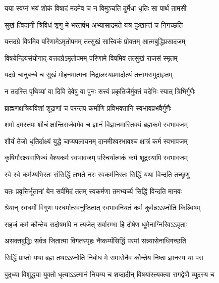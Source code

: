 \twolineshloka
{यया स्वप्नं भयं शोकं विषादं मदमेव च}
{न विमुञ्चति दुर्मेधा धृतिः सा पार्थ तामसी}%

\twolineshloka
{सुखं त्विदानीं त्रिविधं शृणु मे भरतर्षभ}
{अभ्यासाद्रमते यत्र दुःखान्तं च निगच्छति}%

\twolineshloka
{यत्तदग्रे विषमिव परिणामेऽमृतोपमम्}
{तत्सुखं सात्त्विकं प्रोक्तम् आत्मबुद्धिप्रसादजम्}%

\twolineshloka
{विषयेन्द्रियसंयोगाद्-यत्तदग्रेऽमृतोपमम्}
{परिणामे विषमिव तत्सुखं राजसं स्मृतम्}%

\twolineshloka
{यदग्रे चानुबन्धे च सुखं मोहनमात्मनः}
{निद्रालस्यप्रमादोत्थं तत्तामसमुदाहृतम्}%

\twolineshloka
{न तदस्ति पृथिव्यां वा दिवि देवेषु वा पुनः}
{सत्त्वं प्रकृतिजैर्मुक्तं यदेभिः स्यात् त्रिभिर्गुणैः}%

\twolineshloka
{ब्राह्मणक्षत्रियविशां शूद्राणां च परन्तप}
{कर्माणि प्रविभक्तानि स्वभावप्रभवैर्गुणैः}%

\twolineshloka
{शमो दमस्तपः शौचं क्षान्तिरार्जवमेव च}
{ज्ञानं विज्ञानमास्तिक्यं ब्रह्मकर्म स्वभावजम्}%

\twolineshloka
{शौर्यं तेजो धृतिर्दाक्ष्यं युद्धे चाप्यपलायनम्}
{दानमीश्वरभावश्च क्षात्रं कर्म स्वभावजम्}%

\twolineshloka
{कृषिगौरक्ष्यवाणिज्यं वैश्यकर्म स्वभावजम्}
{परिचर्यात्मकं कर्म शूद्रस्यापि स्वभावजम्}%

\twolineshloka
{स्वे स्वे कर्मण्यभिरतः संसिद्धिं लभते नरः}
{स्वकर्मनिरतः सिद्धिं यथा विन्दति तच्छृणु}%

\twolineshloka
{यतः प्रवृत्तिर्भूतानां येन सर्वमिदं ततम्}
{स्वकर्मणा तमभ्यर्च्य सिद्धिं विन्दति मानवः}%

\twolineshloka
{श्रेयान् स्वधर्मो विगुणः परधर्मात्स्वनुष्ठितात्}
{स्वभावनियतं कर्म कुर्वन्नऽऽप्नोति किल्बिषम्}%

\twolineshloka
{सहजं कर्म कौन्तेय सदोषमपि न त्यजेत्}
{सर्वारम्भा हि दोषेण धूमेनाग्निरिवऽऽवृताः}%

\twolineshloka
{असक्तबुद्धिः सर्वत्र जितात्मा विगतस्पृहः}
{नैष्कर्म्यसिद्धिं परमां सन्न्यासेनाधिगच्छति}%

\twolineshloka
{सिद्धिं प्राप्तो यथा ब्रह्म तथाऽऽप्नोति निबोध मे}
{समासेनैव कौन्तेय निष्ठा ज्ञानस्य या परा}%

\twolineshloka
{बुद्‌ध्या विशुद्धया युक्तो धृत्याऽऽत्मानं नियम्य च}
{शब्दादीन् विषयांस्त्यक्त्वा रागद्वेषौ व्युदस्य च}%

